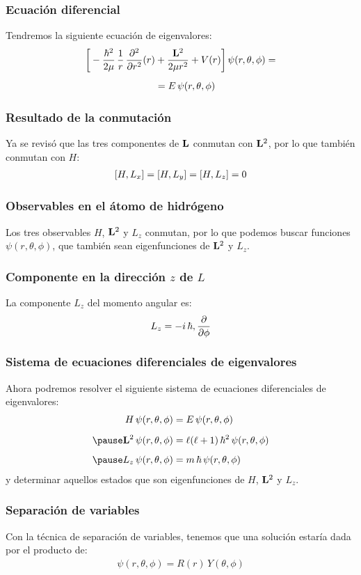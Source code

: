 \documentclass[12pt]{beamer}
\begin{document}
\begin{frame}
\frametitle{Ecuación diferencial}
Tendremos la siguiente ecuación de eigenvalores:
\pause
\begin{align}
\begin{aligned}
\bigg[ - \dfrac{\hbar^{2}}{2 \mu} \, \dfrac{1}{r} \, \pdv[2]{r} (r) &+ \dfrac{\vb{L}^{2}}{2 \mu r^{2}} + V (r) \bigg] \, \psi (r, \theta, \phi) = \\[0.5em]
&= E \, \psi (r, \theta, \phi) 
\end{aligned}
\label{eq:ecuacion_08_01_02}
\end{align}
\end{frame}
\begin{frame}
\frametitle{Resultado de la conmutación}
Ya se revisó que las tres componentes de $\vb{L}$ conmutan con $\vb{L}^{2}$, por lo que también conmutan con $H$:
\pause
\begin{align}
\comm{H}{L_{x}} = \comm{H}{L_{y}} = \comm{H}{L_{z}} = 0
\label{eq:ecuacion_08_04}
\end{align}
\end{frame}
\begin{frame}
\frametitle{Observables en el átomo de hidrógeno}
Los tres observables $H$, $\vb{L}^{2}$ y $L_{z}$ conmutan, por lo que podemos buscar funciones $\psi (r, \theta, \phi)$, que también sean eigenfunciones de $\vb{L}^{2}$ y $L_{z}$.
\end{frame}
\begin{frame}
\frametitle{Componente en la dirección $z$ de $L$}
La componente $L_{z}$ del momento angular es:
\pause
\begin{align*}
L_{z} = - i \, \hbar , \pdv{\phi}
\end{align*}
\end{frame}
\begin{frame}
\frametitle{Sistema de ecuaciones diferenciales de eigenvalores}
Ahora podremos resolver el siguiente sistema de ecuaciones diferenciales de eigenvalores:
\begin{eqnarray}
\begin{aligned}
H \, \psi (r, \theta, \phi) &= E \, \psi (r, \theta, \phi) \label{eq:ecuacion_08_05} \\[0.5em] \pause
\vb{L}^{2} \, \psi (r, \theta, \phi) &= \ell (\ell + 1) \, \hbar^{2} \, \psi (r, \theta, \phi) \label{eq:ecuacion_08_06} \\[0.5em] \pause
L_{z} \, \psi (r, \theta, \phi) &= m \, \hbar \, \psi (r, \theta, \phi) \label{eq:ecuacion_08_07}
\end{aligned}
\end{eqnarray}
\pause
y determinar aquellos estados que son eigenfunciones de $H$, $\vb{L}^{2}$ y $L_{z}$.
\end{frame}
\begin{frame}
\frametitle{Separación de variables}
Con la técnica de separación de variables, tenemos que una solución estaría dada por el producto de:
\pause
\begin{align}
\psi (r, \theta, \phi) = R (r) \, Y (\theta, \phi)
\label{eq:ecuacion_08_08}
\end{align}
\end{frame}
\end{document}
